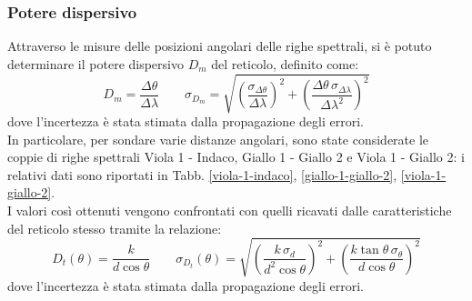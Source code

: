 \documentclass[]{article}
\begin{document}
    \subsubsection{Potere dispersivo}
    Attraverso le misure delle posizioni angolari delle righe spettrali, si è potuto determinare il potere dispersivo $D_{m}$ del reticolo, definito come:
    \begin{equation}
        \label{D-m}
        D_m = \frac{\Delta \theta}{\Delta \lambda} \qquad \sigma_{D_m} = \sqrt{\left(\frac{\sigma_{\Delta\theta}}{\Delta\lambda}\right)^2 + \left(\frac{\Delta\theta \, \sigma_{\Delta\lambda}}{\Delta\lambda^2}\right)^2}
    \end{equation}
    dove l'incertezza è stata stimata dalla propagazione degli errori.\\
    In particolare, per sondare varie distanze angolari, sono state considerate le coppie di righe spettrali Viola 1 - Indaco, Giallo 1 - Giallo 2 e Viola 1 - Giallo 2: i relativi dati sono riportati in Tabb. \ref{viola-1-indaco}, \ref{giallo-1-giallo-2}, \ref{viola-1-giallo-2}. \\
    I valori così ottenuti vengono confrontati con quelli ricavati dalle caratteristiche del reticolo stesso tramite la relazione:
    \begin{equation}
        \label{D-t}
        D_t(\theta) = \frac{k}{d\cos{\theta}} \qquad \sigma_{D_t}(\theta) = \sqrt{\left(\frac{k \, \sigma_d}{d^2 \cos{\theta}}\right)^2 + \left(\frac{k \tan{\theta} \, \sigma_\theta}{d\cos{\theta}}\right)^2}
    \end{equation}
    dove l'incertezza è stata stimata dalla propagazione degli errori.
\end{document}
